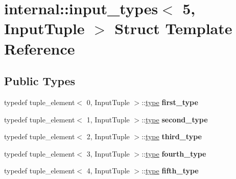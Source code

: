 \hypertarget{structinternal_1_1input__types_3_015_00_01InputTuple_01_4}{}\section{internal\+:\+:input\+\_\+types$<$ 5, Input\+Tuple $>$ Struct Template Reference}
\label{structinternal_1_1input__types_3_015_00_01InputTuple_01_4}
\subsection*{Public Types}
\begin{DoxyCompactItemize}
\item 
\hypertarget{structinternal_1_1input__types_3_015_00_01InputTuple_01_4_a7c5584dd465c0b047a32bf6e357c9f3d}{}typedef tuple\+\_\+element$<$ 0, Input\+Tuple $>$\+::\hyperlink{classinternal_1_1tagged__msg}{type} {\bfseries first\+\_\+type}\label{structinternal_1_1input__types_3_015_00_01InputTuple_01_4_a7c5584dd465c0b047a32bf6e357c9f3d}

\item 
\hypertarget{structinternal_1_1input__types_3_015_00_01InputTuple_01_4_ab36b6d2874478a7087d1f70f7db32472}{}typedef tuple\+\_\+element$<$ 1, Input\+Tuple $>$\+::\hyperlink{classinternal_1_1tagged__msg}{type} {\bfseries second\+\_\+type}\label{structinternal_1_1input__types_3_015_00_01InputTuple_01_4_ab36b6d2874478a7087d1f70f7db32472}

\item 
\hypertarget{structinternal_1_1input__types_3_015_00_01InputTuple_01_4_a902bd04670458b3be4d6ed425403794c}{}typedef tuple\+\_\+element$<$ 2, Input\+Tuple $>$\+::\hyperlink{classinternal_1_1tagged__msg}{type} {\bfseries third\+\_\+type}\label{structinternal_1_1input__types_3_015_00_01InputTuple_01_4_a902bd04670458b3be4d6ed425403794c}

\item 
\hypertarget{structinternal_1_1input__types_3_015_00_01InputTuple_01_4_abb70a8bb666ac519d361bde1d87331be}{}typedef tuple\+\_\+element$<$ 3, Input\+Tuple $>$\+::\hyperlink{classinternal_1_1tagged__msg}{type} {\bfseries fourth\+\_\+type}\label{structinternal_1_1input__types_3_015_00_01InputTuple_01_4_abb70a8bb666ac519d361bde1d87331be}

\item 
\hypertarget{structinternal_1_1input__types_3_015_00_01InputTuple_01_4_ac4eace359d3074e5ffbd7eddb8c325dc}{}typedef tuple\+\_\+element$<$ 4, Input\+Tuple $>$\+::\hyperlink{classinternal_1_1tagged__msg}{type} {\bfseries fifth\+\_\+type}\label{structinternal_1_1input__types_3_015_00_01InputTuple_01_4_ac4eace359d3074e5ffbd7eddb8c325dc}


\end{DoxyCompactItemize}
